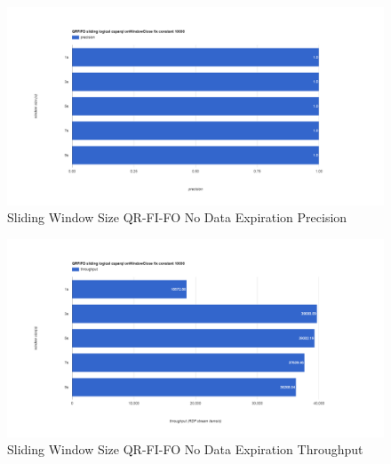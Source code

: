 \begin{figure}[!htbp]
    \centering
    \includegraphics[width=\textwidth]{img/app3-slide-ws-qrfifo-no-p.png}
    \caption{Sliding Window Size QR-FI-FO No Data Expiration Precision}
\end{figure}
\begin{figure}[!htbp]
    \centering
    \includegraphics[width=\textwidth]{img/app3-slide-ws-qrfifo-no-t.png}
    \caption{Sliding Window Size QR-FI-FO No Data Expiration Throughput}
\end{figure}